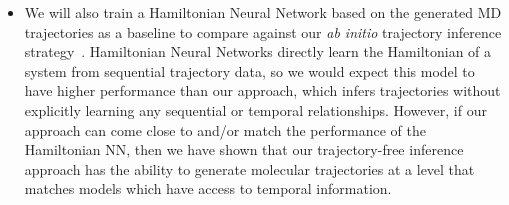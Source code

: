 \documentclass[a4paper,11pt]{article}
\begin{document}
\begin{itemize}
\begin{itemize}
        \item Additionally, because our CNF approach computes exact log-likelihoods, we can easily use it to compute free-energy differences between protein conformations. This offers another benchmarking avenue: we can benchmark CNF performance by comparing chignolin free energy differences computed by our CNF model relative to known experimental values.
    \end{itemize}
    
    
    
    \item We will also train a Hamiltonian Neural Network based on the generated MD trajectories as a baseline to compare against our \textit{ab initio} trajectory inference strategy~\cite{greydanus2019}. Hamiltonian Neural Networks directly learn the Hamiltonian of a system from sequential trajectory data, so we would expect this model to have higher performance than our approach, which infers trajectories without explicitly learning any sequential or temporal relationships. However, if our approach can come close to and/or match the performance of the Hamiltonian NN, then we have shown that our trajectory-free inference approach has the ability to generate molecular trajectories at a level that matches models which have access to temporal information. 
\end{itemize}



\end{document}
